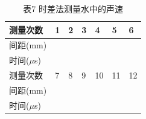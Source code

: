 \documentclass{ctexart}
\begin{document}
\begin{table}[ht]
\centering
\caption*{表7 \hspace{3em}时差法测量水中的声速}
\renewcommand\arraystretch{1.1}
\begin{tabular}{C{9em}*{6}{|C{3em}}}
\hline
\hline
测量次数 & 1 & 2 & 3 & 4 & 5 & 6 \\
\hline
间距(mm) &  &  &  &  &  &  \\
\hline
时间($\mu$s) &  &  &  &  &  &  \\
\hline
\hline
测量次数 & 7 & 8 & 9 & 10 & 11 & 12 \\
\hline
间距(mm) &  &  &  &  &  &  \\
\hline
时间($\mu$s) &  &  &  &  &  &  \\
\hline
\hline
\end{tabular}
\end{table}
\end{document}
